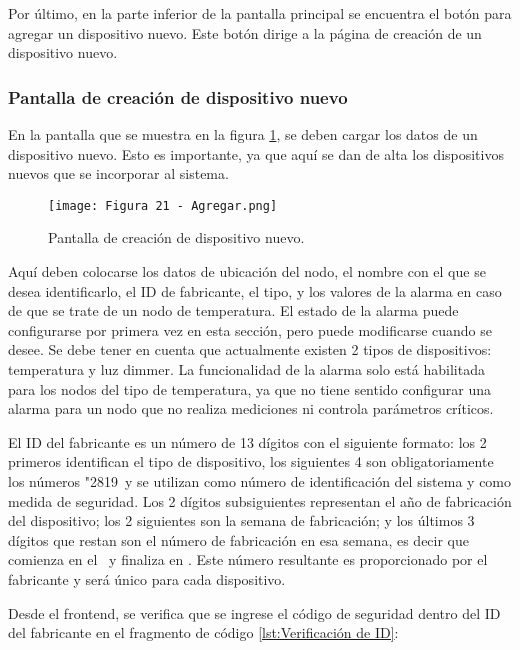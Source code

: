 Por último, en la parte inferior de la pantalla principal se encuentra el botón para agregar un dispositivo nuevo. Este botón dirige a la página de creación de un dispositivo nuevo.

\subsubsection{Pantalla de creación de dispositivo nuevo}

En la pantalla que se muestra en la figura \ref{fig:21}, se deben cargar los datos de un dispositivo nuevo. Esto es importante, ya que aquí se dan de alta los dispositivos nuevos que se incorporar al sistema.

\begin{figure}[h]
\centering
\texttt{[image: Figura 21 - Agregar.png]}
\caption[Pantalla de creación de dispositivo nuevo]{Pantalla de creación de dispositivo nuevo.}
\label{fig:21}
\end{figure}

Aquí deben colocarse los datos de ubicación del nodo, el nombre con el que se desea identificarlo, el ID de fabricante, el tipo, y los valores de la alarma en caso de que se trate de un nodo de temperatura. El estado de la alarma puede configurarse por primera vez en esta sección, pero puede modificarse cuando se desee. Se debe tener en cuenta que actualmente existen 2 tipos de dispositivos: temperatura y luz dimmer. La funcionalidad de la alarma solo está habilitada para los nodos del tipo de temperatura, ya que no tiene sentido configurar una alarma para un nodo que no realiza mediciones ni controla parámetros críticos.

El ID del fabricante es un número de 13 dígitos con el siguiente formato: los 2 primeros identifican el tipo de dispositivo, los siguientes 4 son obligatoriamente los números "2819\textquotedbl\ y se utilizan como número de identificación del sistema y como medida de seguridad. Los 2 dígitos subsiguientes representan el año de fabricación del dispositivo; los 2 siguientes son la semana de fabricación; y los últimos 3 dígitos que restan son el número de fabricación en esa semana, es decir que comienza en el \textquotedbl\ y finaliza en \textquotedbl. Este número resultante es proporcionado por el fabricante y será único para cada dispositivo.

Desde el frontend, se verifica que se ingrese el código de seguridad dentro del ID del fabricante en el fragmento de código \ref{lst:Verificación de ID}:


